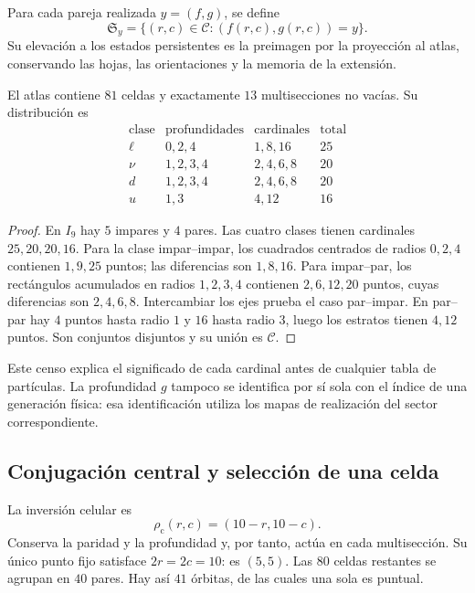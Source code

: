 

\begin{definition}
Para cada pareja realizada \(y=(f,g)\), se define
\[
 \mathfrak S_y=\{(r,c)\in\mathcal C:(f(r,c),g(r,c))=y\}.
\]
Su elevación a los estados persistentes es la preimagen por la proyección
al atlas, conservando las hojas, las orientaciones y la memoria de la extensión.
\end{definition}

\begin{proposition}
\label{vi:vi:prop:censo13}
El atlas contiene \(81\) celdas y exactamente \(13\) multisecciones no vacías.
Su distribución es
\[
\begin{array}{c|c|c|r}
\text{clase}&\text{profundidades}&\text{cardinales}&\text{total}\\\hline
\ell&0,2,4&1,8,16&25\\
\nu&1,2,3,4&2,4,6,8&20\\
d&1,2,3,4&2,4,6,8&20\\
u&1,3&4,12&16
\end{array}
\]
\end{proposition}
\begin{proof}
En \(I_9\) hay \(5\) impares y \(4\) pares. Las cuatro clases tienen
cardinales \(25,20,20,16\). Para la clase impar--impar, los cuadrados
centrados de radios \(0,2,4\) contienen \(1,9,25\) puntos; las
diferencias son \(1,8,16\). Para impar--par, los rectángulos acumulados
en radios \(1,2,3,4\) contienen \(2,6,12,20\) puntos, cuyas
diferencias son \(2,4,6,8\). Intercambiar los ejes prueba el caso
par--impar. En par--par hay \(4\) puntos hasta radio \(1\) y \(16\)
hasta radio \(3\), luego los estratos tienen \(4,12\) puntos.
Son conjuntos disjuntos y su unión es \(\mathcal C\).
\end{proof}

Este censo explica el significado de cada cardinal antes de cualquier tabla
de partículas. La profundidad \(g\) tampoco se identifica por sí sola con
el índice de una generación física: esa identificación utiliza los mapas
de realización del sector correspondiente.

\subsection{Conjugación central y selección de una celda}

La inversión celular es
\[
 \rho_{\mathrm c}(r,c)=(10-r,10-c).
\]
Conserva la paridad y la profundidad y, por tanto, actúa en cada
multisección. Su único punto fijo satisface \(2r=2c=10\): es \((5,5)\).
Las \(80\) celdas restantes se agrupan en \(40\) pares. Hay así
\(41\) órbitas, de las cuales una sola es puntual.

